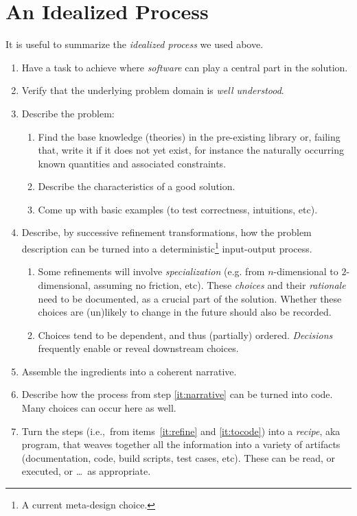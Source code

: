 \documentclass[a4paper,UKenglish,cleveref,autoref,thm-restate]{oasics-v2021}
\begin{document}
\section{An Idealized Process}
\label{sec:idealized-process}

It is useful to summarize the \emph{idealized process} we used above.

\begin{enumerate}
\item\label{it:problem} Have a task to achieve where \emph{software} can
play a central part in the solution.
\item\label{it:understood} Verify that the underlying problem domain is \emph{well
understood}.
\item\label{it:probdesc} Describe the problem:
  \begin{enumerate}
  \item Find the base knowledge (theories) in the pre-existing library or,
    failing that, write it if it does not yet exist, for instance the
    naturally occurring known quantities and associated constraints.
  \item Describe the characteristics of a good solution.
  \item Come up with basic examples (to test correctness, intuitions, etc).
  \end{enumerate}
\item\label{it:refine} Describe, by successive refinement transformations,
how the problem description can be turned into a deterministic\footnote{A current
meta-design choice.} input-output process.
  \begin{enumerate}
  \item Some refinements will involve \emph{specialization} (e.g. from
    \(n\)-dimensional to \(2\)-dimensional, assuming no friction, etc).  These
    \emph{choices} and their \emph{rationale} need to be documented, as a
    crucial part of the solution.  Whether these choices are (un)likely to
    change in the future should also be recorded.
  \item Choices tend to be dependent, and thus (partially) ordered.
   \emph{Decisions} frequently enable or reveal downstream choices.
  \end{enumerate}
\item\label{it:narrative} Assemble the ingredients into a coherent narrative.
\item\label{it:tocode} Describe how the process from step \ref{it:narrative}
can be turned into code. Many choices can occur here as well.
\item\label{it:recipe} Turn the steps (i.e.,\ from items~\ref{it:refine} and
\ref{it:tocode}) into a \emph{recipe}, aka program, that weaves together all
the information into a variety of artifacts (documentation, code, build
scripts, test cases, etc). These can be read, or executed, or \ldots\, as
appropriate.
\end{enumerate}
\end{document}
